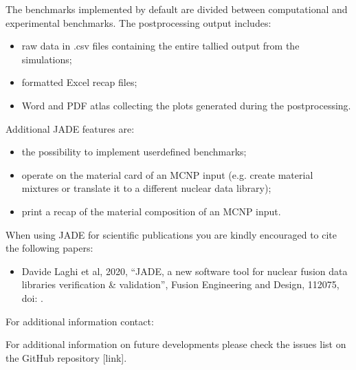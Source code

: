 \documentclass[letterpaper,10pt,english]{sphinxmanual}
\begin{document}
The benchmarks implemented by default are divided between computational
and experimental benchmarks. The post\sphinxhyphen{}processing output includes:
\begin{itemize}
\item {} 
raw data in .csv files containing the entire tallied output from the
simulations;

\item {} 
formatted Excel recap files;

\item {} 
Word and PDF atlas collecting the plots generated during the post\sphinxhyphen{}processing.

\end{itemize}

Additional JADE features are:
\begin{itemize}
\item {} 
the possibility to implement user\sphinxhyphen{}defined benchmarks;

\item {} 
operate on the material card of an MCNP input (e.g. create material mixtures
or translate it to a different nuclear data library);

\item {} 
print a recap of the material composition of an MCNP input.

\end{itemize}

When using JADE for scientific publications you are kindly encouraged to cite the following papers:
\begin{itemize}
\item {} 
Davide Laghi et al, 2020, “JADE, a new software tool for nuclear fusion data libraries verification \& validation”,
Fusion Engineering and Design,  112075, doi: .

\end{itemize}

For additional information contact: 

For additional information on future developments please check the issues list on the
GitHub repository {[}link{]}.
\end{document}
